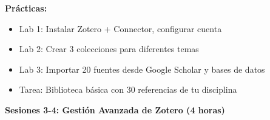 \documentclass[12pt,a4paper]{yaac-luatex}
\newcommand{\subsecciontitulo}[1]{
	{\color{maincolor}\large\bfseries #1}
}
\begin{document}
\begin{tcolorbox}[
		enhanced,
		colback=white,
		colframe=curso2color,
		arc=3pt,
		boxrule=1.5pt,
		left=10pt,
		right=10pt,
		top=8pt,
		bottom=8pt,
		breakable
		]
		\textbf{Prácticas:}
		\begin{itemize}[leftmargin=*, itemsep=0.1cm]
			\item Lab 1: Instalar Zotero + Connector, configurar cuenta
			\item Lab 2: Crear 3 colecciones para diferentes temas
			\item Lab 3: Importar 20 fuentes desde Google Scholar y bases de datos
			\item Tarea: Biblioteca básica con 30 referencias de tu disciplina
		\end{itemize}
	\end{tcolorbox}
	
	\vspace{0.3cm}
	
	\begin{tcolorbox}[
		enhanced,
		colback=white,
		colframe=curso2color,
		arc=3pt,
		boxrule=1.5pt,
		left=10pt,
		right=10pt,
		top=8pt,
		bottom=8pt,
		breakable
		]
		\subsecciontitulo{Sesiones 3-4: Gestión Avanzada de Zotero (4 horas)}
		

\end{tcolorbox}
\end{document}
